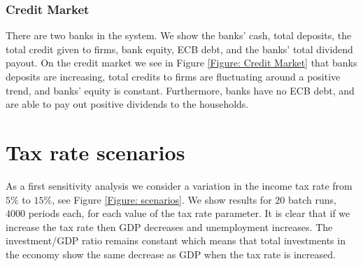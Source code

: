 \subsubsection*{Credit Market}
There are two banks in the system. 
We show the banks' cash, total deposits, the total credit given to firms, bank equity, ECB debt, and the banks' total dividend payout.
On the credit market we see in Figure \ref{Figure: Credit Market} that banks deposits are increasing, total credits to firms are fluctuating around a positive trend, and banks' equity is constant. Furthermore, banks have no ECB debt, and are able to pay out positive dividends to the households.


\section{Tax rate scenarios}
As a first sensitivity analysis we consider a variation in the income tax rate from $5\%$ to $15\%$, see Figure \ref{Figure: scenarios}.
We show results for $20$ batch runs, $4000$ periods each, for each value of the tax rate parameter.
It is clear that if we increase the tax rate then GDP decreases and unemployment increases.
The investment/GDP ratio remains constant which means that total investments in the economy show the same decrease as GDP when the tax rate is increased.




%


